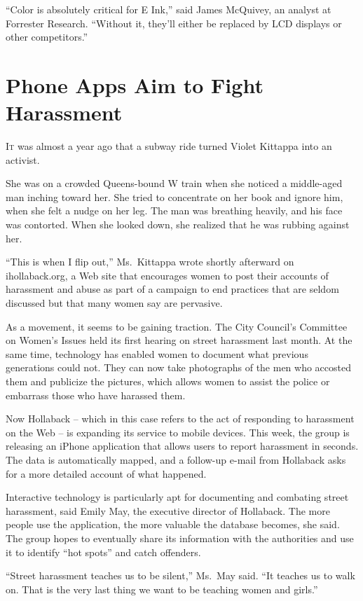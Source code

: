 ﻿\documentclass[12pt]{article}
\begin{document}
``Color is absolutely critical for E Ink,'' said James McQuivey, an analyst at Forrester Research.
``Without it, they'll either be replaced by LCD displays or other competitors.''

\section{Phone Apps Aim to Fight Harassment}

\lettrine{I}{t} was almost a year ago that a subway ride turned Violet
Kittappa into an activist.

She was on a crowded Queens-bound W train when she noticed a middle-aged man inching toward her. She
tried to concentrate on her book and ignore him, when she felt a nudge on her leg. The man was
breathing heavily, and his face was contorted. When she looked down, she realized that he was
rubbing against her.

``This is when I flip out,'' Ms.~Kittappa wrote shortly afterward on ihollaback.org, a Web site that
encourages women to post their accounts of harassment and abuse as part of a campaign to end
practices that are seldom discussed but that many women say are pervasive.

As a movement, it seems to be gaining traction. The City Council's Committee on Women's Issues held
its first hearing on street harassment last month. At the same time, technology has enabled women to
document what previous generations could not. They can now take photographs of the men who accosted
them and publicize the pictures, which allows women to assist the police or embarrass those who have
harassed them.

Now Hollaback -- which in this case refers to the act of responding to harassment on the Web -- is
expanding its service to mobile devices. This week, the group is releasing an iPhone application
that allows users to report harassment in seconds. The data is automatically mapped, and a follow-up
e-mail from Hollaback asks for a more detailed account of what happened.

Interactive technology is particularly apt for documenting and combating street harassment, said
Emily May, the executive director of Hollaback. The more people use the application, the more
valuable the database becomes, she said. The group hopes to eventually share its information with
the authorities and use it to identify ``hot spots'' and catch offenders.

``Street harassment teaches us to be silent,'' Ms.~May said. ``It teaches us to walk on. That is the
very last thing we want to be teaching women and girls.''
\end{document}
